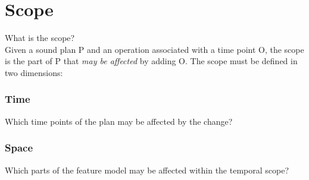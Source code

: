 
\section{Scope}
\label{sec:scope}
What is the scope?
\\

Given a sound plan P and an operation associated with a time point O, the scope is the part of P that \textit{may be affected} by adding O. The scope must be defined in two dimensions:\\

\subsubsection*{Time}
Which time points of the plan may be affected by the change?

\subsubsection*{Space}
Which parts of the feature model may be affected within the temporal scope?

